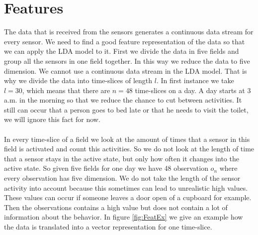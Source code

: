 \documentclass[11pt,a4paper]{article}
\begin{document}
\section{Features}
\label{sec:features}
The data that is received from the sensors generates a continuous data stream for every sensor. We need to find a good feature representation of the data so that we can apply the LDA model to it.
First we divide the data in five fields and group all the sensors in one field together. In this way we reduce the data to five dimension. We cannot use a continuous data stream in the LDA model. That is why we divide the data into time-slices of length $l$. In first instance we take $l=30$, which means that there are $n=48$ time-slices on a day.
A day starts at 3 a.m. in the morning so that we reduce the chance to cut between activities. It still can occur that a person goes to bed late or that he needs to visit the toilet, we will ignore this fact for now.\\
\\
In every time-slice of a field we look at the amount of times that a sensor in this field is activated and count this activities. So we do not look at the length of time that a sensor stays in the active state, but only how often it changes into the active state. So given five fields for one day we have 48 observation $o_n$ where every observation has five dimension. We do not take the length of the sensor activity into account because this sometimes can lead to unrealistic high values. These values can occur if someone leaves a door open of a cupboard for example. Then the observations contains a high value but does not contain a lot of information about the behavior. In figure \ref{fig:FeatEx} we give an example how the data is translated into a vector representation for one time-slice.%
\end{document}
